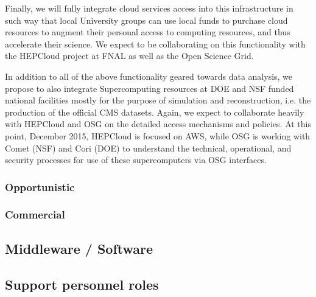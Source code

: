 Finally, we will fully integrate cloud services access into this infrastructure in such way that local University groups can use local funds to
purchase cloud resources to augment their personal access to computing resources, and thus accelerate their science. We expect to be
collaborating on this functionality with the HEPCloud project at FNAL as well as the Open Science Grid.

In addition to all of the above functionality geared towards data analysis, we propose to also integrate Supercomputing resources at DOE and NSF funded national facilities mostly for the purpose of simulation and reconstruction, i.e. the production of the official CMS datasets. 
Again, we expect to collaborate heavily with HEPCloud and OSG on the detailed access mechanisms and policies.
At this point, December 2015, HEPCloud is focused on AWS, while OSG is working with Comet (NSF) and Cori (DOE) to understand
the technical, operational, and security processes for use of these supercomputers via OSG interfaces.


\subsubsection{Opportunistic}
\subsubsection{Commercial}

\subsection{Middleware / Software}

\subsection{Support personnel roles}

